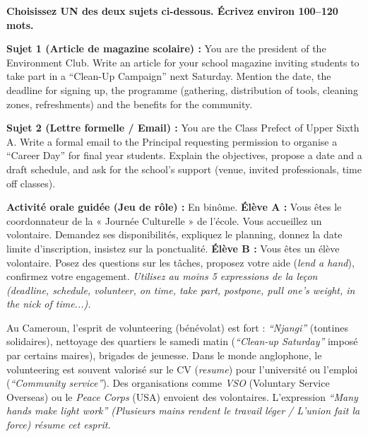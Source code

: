 \documentclass[11pt]{article}
\newcommand{\cle}[1]{{\popxbold\color{popdark}#1}}
\newcommand{\eng}[1]{\ifmmode\text{\textit{#1}}\else\begingroup\selectlanguage{english}\itshape #1\endgroup\fi}
\begin{document}
\begin{exercice}
\textbf{Choisissez UN des deux sujets ci-dessous. Écrivez environ 100--120 mots.}

\textbf{Sujet 1 (Article de magazine scolaire) :}
You are the president of the Environment Club. Write an article for your school magazine inviting students to take part in a “Clean-Up Campaign” next Saturday. Mention the date, the deadline for signing up, the programme (gathering, distribution of tools, cleaning zones, refreshments) and the benefits for the community.

\textbf{Sujet 2 (Lettre formelle / Email) :}
You are the Class Prefect of Upper Sixth A. Write a formal email to the Principal requesting permission to organise a “Career Day” for final year students. Explain the objectives, propose a date and a draft schedule, and ask for the school's support (venue, invited professionals, time off classes).

\medskip
\textbf{Activité orale guidée (Jeu de rôle) :}
En binôme. \textbf{Élève A :} Vous êtes le coordonnateur de la « Journée Culturelle » de l'école. Vous accueillez un volontaire. Demandez ses disponibilités, expliquez le planning, donnez la date limite d'inscription, insistez sur la ponctualité. \textbf{Élève B :} Vous êtes un élève volontaire. Posez des questions sur les tâches, proposez votre aide (\textit{lend a hand}), confirmez votre engagement. \textit{Utilisez au moins 5 expressions de la leçon (deadline, schedule, volunteer, on time, take part, postpone, pull one's weight, in the nick of time...).}
\end{exercice}

\begin{savaistu}
Au Cameroun, l'esprit de \cle{volunteering} (bénévolat) est fort : \textit{“Njangi”} (tontines solidaires), nettoyage des quartiers le samedi matin (\textit{“Clean-up Saturday”} imposé par certains maires), brigades de jeunesse. Dans le monde anglophone, le \cle{volunteering} est souvent valorisé sur le CV (\textit{resume}) pour l'université ou l'emploi (\textit{“Community service”}). Des organisations comme \textit{VSO} (Voluntary Service Overseas) ou le \textit{Peace Corps} (USA) envoient des volontaires. L'expression \eng{“Many hands make light work”} (Plusieurs mains rendent le travail léger / L'union fait la force) résume cet esprit.
\end{savaistu}
\end{document}
